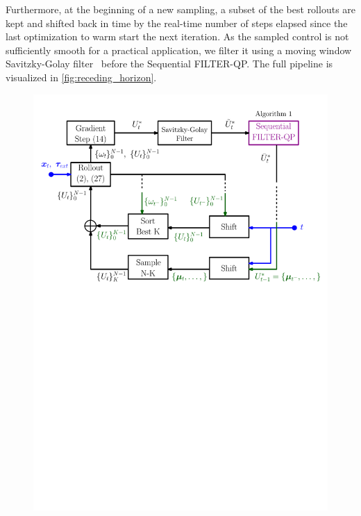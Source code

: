 Furthermore, at the beginning of a new sampling, a subset of the best rollouts are kept and shifted back in time by the real-time number of steps elapsed since the last optimization to warm start the next iteration. 
As the sampled control is not sufficiently smooth for a practical application, we filter it using a moving window Savitzky-Golay filter~\cite{gorry1990general} before the Sequential FILTER-QP.  The full pipeline is visualized in \fig \ref{fig:receding_horizon}.

\begin{figure}[t]
    \centering
    \includegraphics[width=\columnwidth]{figures/schemes/receding_horizon2.pdf}

\end{figure}
